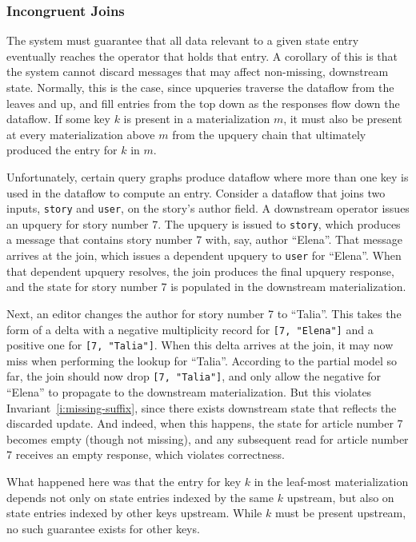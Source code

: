 \subsubsection{Incongruent Joins}
\label{join-evictions}

The system must guarantee that all data relevant to a given state entry
eventually reaches the operator that holds that entry. A corollary of this is
that the system cannot discard messages that may affect non-missing, downstream
state. Normally, this is the case, since upqueries traverse the dataflow from
the leaves and up, and fill entries from the top down as the responses flow down
the dataflow. If some key $k$ is present in a materialization $m$, it must also
be present at every materialization above $m$ from the upquery chain that
ultimately produced the entry for $k$ in $m$.

Unfortunately, certain query graphs produce dataflow where more than one key is
used in the dataflow to compute an entry. Consider a dataflow that joins two
inputs, \texttt{story} and \texttt{user}, on the story's author field. A
downstream operator issues an upquery for story number 7. The upquery is issued
to \texttt{story}, which produces a message that contains story number 7 with,
say, author ``Elena''. That message arrives at the join, which issues a
dependent upquery to \texttt{user} for ``Elena''. When that dependent upquery
resolves, the join produces the final upquery response, and the state for story
number 7 is populated in the downstream materialization.

Next, an editor changes the author for story number 7 to ``Talia''. This
takes the form of a delta with a negative multiplicity record for \texttt{[7,
"Elena"]} and a positive one for \texttt{[7, "Talia"]}. When this delta arrives
at the join, it may now miss when performing the lookup for ``Talia''. According
to the partial model so far, the join should now drop \texttt{[7, "Talia"]}, and
only allow the negative for ``Elena'' to propagate to the downstream
materialization. But this violates Invariant~\ref{i:missing-suffix}, since there
exists downstream state that reflects the discarded update. And indeed, when
this happens, the state for article number 7 becomes empty (though not missing),
and any subsequent read for article number 7 receives an empty response, which
violates correctness.

What happened here was that the entry for key $k$ in the leaf-most
materialization depends not only on state entries indexed by the same $k$
upstream, but also on state entries indexed by other keys upstream. While $k$
must be present upstream, no such guarantee exists for other keys.


